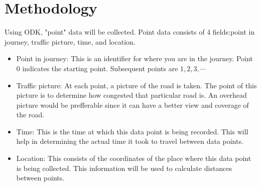 \documentclass[11pt]{article}
\begin{document}
\section{Methodology}
Using ODK, "point" data will be collected. Point data consists of 4 fields:point in journey, traffic picture, time, and location.
\begin{itemize}
\item Point in journey: This is an identifier for where you are in the journey. Point 0 indicates the starting point. Subsequent points are $1, 2,3, \cdots $

\item Traffic picture: At each point, a picture of the road is taken. The point of this picture is to determine how congested that particular road is. An overhead picture would be prefferable since it can have a better view and coverage of the road.

\item Time: This is the time at which this data point is being recorded. This will help in determining the actual time it took to travel between data points.

\item Location: This consists of the coordinates of the place where this data point is being collected. This information will be used to calculate distances between points. 
\end{itemize}
\end{document}
